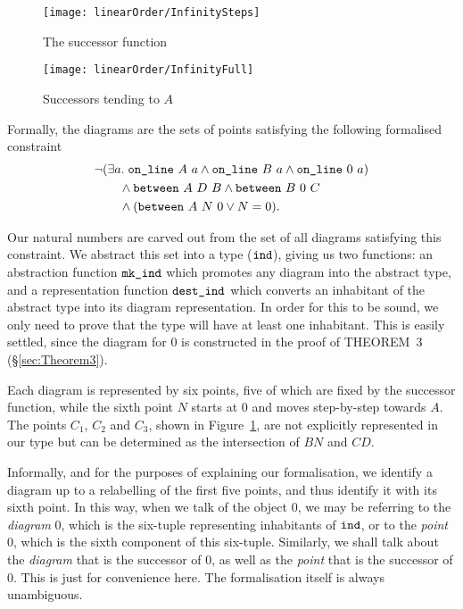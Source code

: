 \begin{figure}
\centering\texttt{[image: linearOrder/InfinitySteps]}
\caption{The successor function}
\label{fig:successor}
\end{figure}

\begin{figure}
\centering\texttt{[image: linearOrder/InfinityFull]}
\caption{Successors tending to $A$}
\label{fig:FullSuccessor}
\end{figure}

Formally, the diagrams are the sets of points satisfying the following formalised constraint
\begin{equation}\label{theorem:IndConstraint}
\begin{aligned}
&\neg(\exists a.\; \texttt{on\_line}\ A\ a\wedge \texttt{on\_line}\ B\ a\wedge \texttt{on\_line}\ 0\ a)\\
&\qquad\wedge \texttt{between}\ A\ D\ B \wedge \texttt{between}\ B\ 0\ C\\
&\qquad\wedge (\texttt{between}\ A\ N\ 0 \vee N = 0).
\end{aligned}
\end{equation}

Our natural numbers are carved out from the set of all diagrams satisfying this constraint. We abstract this set into a type ($\texttt{ind}$), giving us two functions: an abstraction function $\texttt{mk\_ind}$ which promotes any diagram into the abstract type, and a representation function $\texttt{dest\_ind}$ which converts an inhabitant of the abstract type into its diagram representation. In order for this to be sound, we only need to prove that the type will have at least one inhabitant. This is easily settled, since the diagram for $0$ is constructed in the proof of THEOREM~3 (\S\ref{sec:Theorem3}). 

Each diagram is represented by six points, five of which are fixed by the successor function, while the sixth point $N$ starts at $0$ and moves step-by-step towards $A$. The points $C_1$, $C_2$ and $C_3$, shown in Figure~\ref{fig:successor}, are not explicitly represented in our type but can be determined as the intersection of $BN$ and $CD$.

Informally, and for the purposes of explaining our formalisation, we identify a diagram up to a relabelling of the first five points, and thus identify it with its sixth point. In this way, when we talk of the object $0$, we may be referring to the \emph{diagram} 0, which is the six-tuple representing inhabitants of $\texttt{ind}$, or to the \emph{point} 0, which is the sixth component of this six-tuple. Similarly, we shall talk about the \emph{diagram} that is the successor of 0, as well as the \emph{point} that is the successor of 0. This is just for convenience here. The formalisation itself is always unambiguous.

